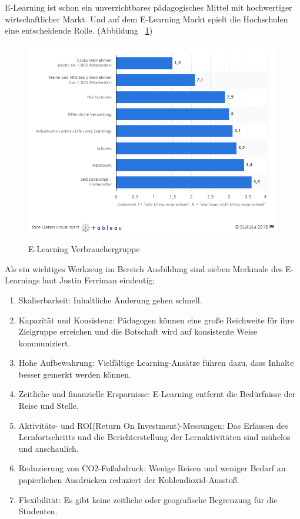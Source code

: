 E-Learning ist schon ein unverzichtbares pädagogisches Mittel mit hochwertiger wirtschaftlicher Markt. Und auf dem E-Learning Markt spielt die Hochschulen eine entscheidende Rolle. (Abbildung ~\ref{fig:zielgruppe})

\begin{figure}[ht]
\vspace*{1em}
\centering
\caption[E-Learning Verbrauchergruppe]{E-Learning Verbrauchergruppe}
\includegraphics[width=\textwidth]{images/zielgruppe.png}
\label{fig:zielgruppe} 
\end{figure}

Als ein wichtiges Werkzeug im Bereich Ausbildung sind sieben Merkmale des E-Learnings laut Justin Ferriman \citep{6} eindeutig:

\begin{enumerate}
\item Skalierbarkeit: Inhaltliche Änderung gehen schnell. 
\item Kapazität und Konsistenz: Pädagogen können eine große Reichweite für ihre Zielgruppe erreichen und die Botschaft wird auf konsistente Weise kommuniziert.
\item Hohe Aufbewahrung: Vielfältige Learning-Ansätze führen dazu, dass Inhalte besser gemerkt werden können.
\item Zeitliche und finanzielle Ersparnisse: E-Learning entfernt die Bedürfnisse der Reise und Stelle.
\item Aktivitäts- und ROI(Return On Investment)-Messungen: Das Erfassen des Lernfortschritts und die Berichterstellung der Lernaktivitäten sind mühelos und anschaulich.
\item Reduzierung von CO2-Fußabdruck: Wenige Reisen und weniger Bedarf an papierlichen Ausdrücken reduziert der Kohlendioxid-Ausstoß.
\item Flexibilität: Es gibt keine zeitliche oder geografische Begrenzung für die Studenten.
\end{enumerate}\

